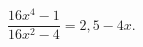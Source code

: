 \begin{ex}[type=equation]
	\begin{condition}
		$\dfrac{16x^4 - 1}{16x^2 - 4} = 2,5 - 4x.$
	\end{condition}
\end{ex}
